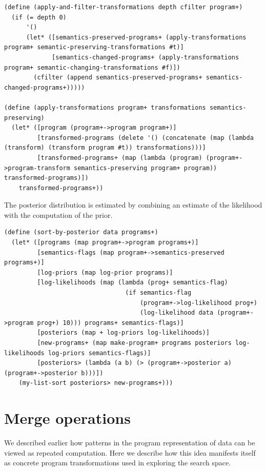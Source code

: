 \documentclass[a4paper,10pt]{article}
\begin{document}
\begin{lstlisting}[frame=trBL]
(define (apply-and-filter-transformations depth cfilter program+)
  (if (= depth 0)
      '()
      (let* ([semantics-preserved-programs+ (apply-transformations program+ semantic-preserving-transformations #t)]
             [semantics-changed-programs+ (apply-transformations program+ semantic-changing-transformations #f)])
        (cfilter (append semantics-preserved-programs+ semantics-changed-programs+)))))

(define (apply-transformations program+ transformations semantics-preserving)
  (let* ([program (program+->program program+)]
         [transformed-programs (delete '() (concatenate (map (lambda (transform) (transform program #t)) transformations)))]
         [transformed-programs+ (map (lambda (program) (program+->program-transform semantics-preserving program+ program)) transformed-programs)])
    transformed-programs+))
\end{lstlisting}
The posterior distribution is estimated by combining an estimate of the likelihood with the computation of the prior.  
\begin{lstlisting}[frame=trBL]
(define (sort-by-posterior data programs+)
  (let* ([programs (map program+->program programs+)]
         [semantics-flags (map program+->semantics-preserved programs+)]
         [log-priors (map log-prior programs)]
         [log-likelihoods (map (lambda (prog+ semantics-flag)
                                 (if semantics-flag
                                     (program+->log-likelihood prog+)
                                     (log-likelihood data (program+->program prog+) 10))) programs+ semantics-flags)]
         [posteriors (map + log-priors log-likelihoods)] 
         [new-programs+ (map make-program+ programs posteriors log-likelihoods log-priors semantics-flags)]
         [posteriors> (lambda (a b) (> (program+->posterior a) (program+->posterior b)))])
    (my-list-sort posteriors> new-programs+)))
\end{lstlisting}


\newpage
\section{Merge operations}
We described earlier how patterns in the program representation of data can be viewed as repeated computation.  Here we describe how this idea manifests itself as concrete program transformations used in exploring the search space.
\end{document}
